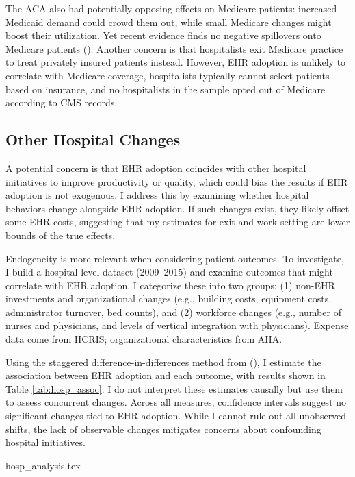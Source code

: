 \documentclass[12pt]{article}
\begin{document}
The ACA also had potentially opposing effects on Medicare patients: increased Medicaid demand could crowd them out, while small Medicare changes might boost their utilization. Yet recent evidence finds no negative spillovers onto Medicare patients (\cite{carey2020impact}). Another concern is that hospitalists exit Medicare practice to treat privately insured patients instead. However, EHR adoption is unlikely to correlate with Medicare coverage, hospitalists typically cannot select patients based on insurance, and no hospitalists in the sample opted out of Medicare according to CMS records.



\subsection{Other Hospital Changes}\label{sec:hospanalysis}

A potential concern is that EHR adoption coincides with other hospital initiatives to improve productivity or quality, which could bias the results if EHR adoption is not exogenous. I address this by examining whether hospital behaviors change alongside EHR adoption. If such changes exist, they likely offset some EHR costs, suggesting that my estimates for exit and work setting are lower bounds of the true effects.

Endogeneity is more relevant when considering patient outcomes. To investigate, I build a hospital-level dataset (2009–2015) and examine outcomes that might correlate with EHR adoption. I categorize these into two groups: (1) non-EHR investments and organizational changes (e.g., building costs, equipment costs, administrator turnover, bed counts), and (2) workforce changes (e.g., number of nurses and physicians, and levels of vertical integration with physicians). Expense data come from HCRIS; organizational characteristics from AHA.

Using the staggered difference-in-differences method from \citeauthor{callaway2021difference} (\citeyear{callaway2021difference}), I estimate the association between EHR adoption and each outcome, with results shown in Table \ref{tab:hosp_assoc}. I do not interpret these estimates causally but use them to assess concurrent changes. Across all measures, confidence intervals suggest no significant changes tied to EHR adoption. While I cannot rule out all unobserved shifts, the lack of observable changes mitigates concerns about confounding hospital initiatives.

{hosp_analysis.tex}
\end{document}
